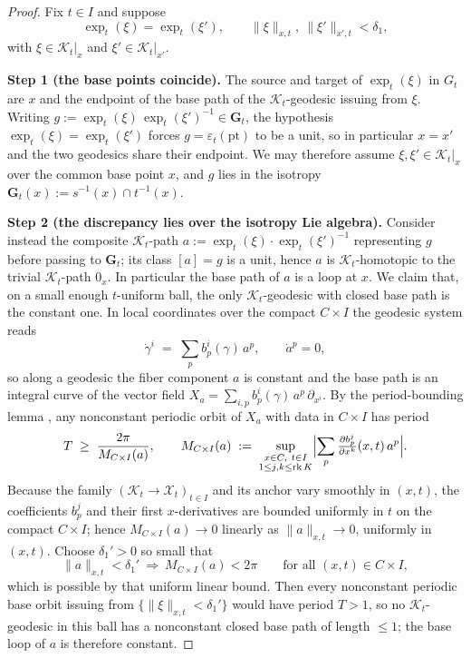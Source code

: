 \documentclass[reqno]{amsart}
\theoremstyle{plain}
\theoremstyle{definition}
\newcommand{\X}{\mathcal{X}}
\newcommand{\K}{\mathcal{K}}
\begin{document}
\begin{proof}
Fix $t \in I$ and suppose
\[
  \exp_t(\xi) = \exp_t(\xi'), \qquad
  \|\xi\|_{x,t},\ \|\xi'\|_{x',t} < \delta_1 ,
\]
with $\xi \in \K_t|_x$ and $\xi' \in \K_t|_{x'}$.

\smallskip
\noindent\textbf{Step 1 (the base points coincide).}
The source and target of $\exp_t(\xi)$ in $G_t$ are $x$ and the endpoint of the base path of the $\K_t$-geodesic issuing from $\xi$. Writing
$g := \exp_t(\xi)\,\exp_t(\xi')^{-1} \in \mathbf{G}_t$, the hypothesis $\exp_t(\xi)=\exp_t(\xi')$ forces $g = \varepsilon_t(\text{pt})$ to be a unit, so in particular $x=x'$ and the two geodesics share their endpoint. We may
therefore assume $\xi,\xi' \in \K_t|_x$ over the common base point $x$, and $g$ lies in the isotropy $\mathbf{G}_t(x) := s^{-1}(x)\cap t^{-1}(x)$.

\smallskip
\noindent\textbf{Step 2 (the discrepancy lies over the isotropy Lie algebra).}
Consider instead the composite $\K_t$-path
$a := \exp_t(\xi)\cdot\exp_t(\xi')^{-1}$ representing $g$ before passing to $\mathbf{G}_t$; its class $[a]=g$ is a unit, hence $a$ is $\K_t$-homotopic to the trivial $\K_t$-path $0_x$. In particular the base path of $a$ is a loop at $x$.
We claim that, on a small enough $t$-uniform ball, the only $\K_t$-geodesic with closed base path is the constant one. In local coordinates over the compact $C\times I$ the geodesic system reads
\[
  \dot\gamma^i \;=\; \sum_p b^i_p(\gamma)\,a^p, \qquad \dot a^p = 0 ,
\]
so along a geodesic the fiber component $a$ is constant and the base path is an integral curve of the vector field $X_a = \sum_{i,p} b^i_p(\gamma)\,a^p\,
\partial_{x^i}$. By the period-bounding lemma \cite[Lemma]{yorke1969periods}, any
nonconstant periodic orbit of $X_a$ with data in $C\times I$ has period
\[
  T \;\ge\; \frac{2\pi}{M_{C\times I}(a)}, \qquad
  M_{C\times I}(a) \;:=\;
  \sup_{\substack{x\in C,\ t\in I \\ 1\le j,k\le \operatorname{rk}K}}
  \Bigl|\sum_p \tfrac{\partial b^j_p}{\partial x^k}(x,t)\,a^p\Bigr| .
\]
Because the family $(\K_t\to \X_t)_{t\in I}$ and its anchor vary smoothly in $(x,t)$, the coefficients $b^j_p$ and their first $x$-derivatives are bounded uniformly in $t$ on the compact $C\times I$; hence $M_{C\times I}(a)\to 0$ linearly as $\|a\|_{x,t}\to 0$, uniformly in $(x,t)$. Choose $\delta_1'>0$ so small that
\[
  \|a\|_{x,t} < \delta_1' \ \Longrightarrow\ M_{C\times I}(a) < 2\pi
  \qquad\text{for all } (x,t)\in C\times I ,
\]
which is possible by that uniform linear bound. Then every nonconstant periodic base orbit issuing from $\{\|\xi\|_{x,t}<\delta_1'\}$ would have period $T > 1$, so no $\K_t$-geodesic in this ball has a nonconstant closed base path of length $\le 1$; the base loop of $a$ is therefore constant.


\end{proof}
\end{document}
